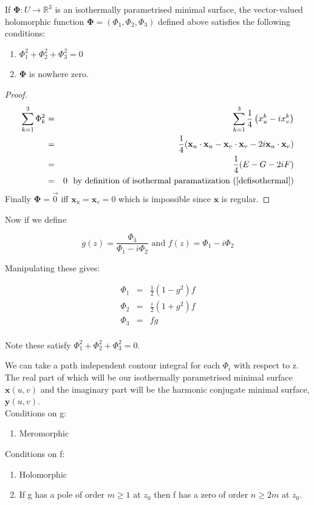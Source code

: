 \begin{theorem}
If $\mathbf \Phi: U \rightarrow \mathbb R^3$ is an isothermally parametrised minimal surface, the vector-valued holomorphic function $\mathbf \Phi=(\Phi_1, \Phi_2, \Phi_3)$ defined above satisfies the following conditions:
\begin{enumerate}
	\item $\Phi_1^2+\Phi_2^2+\Phi_3^2 = 0$ 
	\item $\mathbf \Phi$ is nowhere zero.
\end{enumerate}
\end{theorem}

\begin{proof}
\begin{eqnarray}
\nonumber
\sum_{k=1}^3 \Phi_k^2 &=& \sum_{k=1}^3 \frac{1}{4}\left(x_u^k - i x_v^k \right) \\
\nonumber
&=& \frac{1}{4}(\mathbf x_u \cdot \mathbf x_u - \mathbf x_v \cdot \mathbf x_v - 2i \mathbf x_u \cdot \mathbf x_v) \\
\nonumber
&=& \frac{1}{4}(E - G - 2i F) \\
\nonumber
&=& 0 \mbox{\ \ by definition of isothermal paramatization (\ref{defisothermal})}
\end{eqnarray}
Finally $\mathbf \Phi = \vec 0$ iff $\mathbf x_u = \mathbf x_v = 0$ which is impossible since $\mathbf x$ is regular.
\end{proof}

Now if we define

\begin{displaymath}
g(z) = \frac{\Phi_3}{\Phi_1-i\Phi_2} \mbox{\ and \ } f(z) = \Phi_1-i\Phi_2
\end{displaymath} 

Manipulating these gives:

\begin{eqnarray}
\nonumber
\Phi_1 &=& \frac{1}{2}(1-g^2)f \\
\nonumber
\Phi_2 &=& \frac{i}{2}(1+g^2)f \\
\nonumber
\Phi_3 &=& fg\\
\end{eqnarray}

Note these satisfy $\Phi_1^2+\Phi_2^2+\Phi_3^2 = 0$.
 
We can take a path independent contour integral for each $\Phi_i$ with respect to z. The real part of which will be our isothermally parametrised minimal surface $\mathbf x(u,v)$ and the imaginary part will be the harmonic conjugate minimal surface, $\mathbf y(u,v)$.\\
Conditions on g:
\begin{enumerate}
	\item Meromorphic
\end{enumerate}
Conditions on f:
\begin{enumerate}
	\item Holomorphic
	\item If g has a pole of order $m \geq 1$ at $z_0$ then f has a zero of order $n \geq 2m$ at $z_0$.
\end{enumerate}

